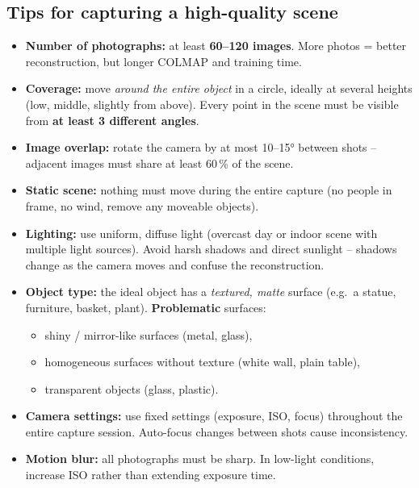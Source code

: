 \documentclass{article}
\begin{document}
\subsection*{Tips for capturing a high-quality scene}

\begin{itemize}
    \item \textbf{Number of photographs:} at least \textbf{60--120 images}.
          More photos = better reconstruction, but longer COLMAP and training time.
    \item \textbf{Coverage:} move \emph{around the entire object} in a circle,
          ideally at several heights (low, middle, slightly from above).
          Every point in the scene must be visible from \textbf{at least 3 different angles}.
    \item \textbf{Image overlap:} rotate the camera by at most 10--15° between shots --
          adjacent images must share at least 60\,\% of the scene.
    \item \textbf{Static scene:} nothing must move during the entire capture
          (no people in frame, no wind, remove any moveable objects).
    \item \textbf{Lighting:} use uniform, diffuse light (overcast day or
          indoor scene with multiple light sources).
          Avoid harsh shadows and direct sunlight -- shadows change as the
          camera moves and confuse the reconstruction.
    \item \textbf{Object type:} the ideal object has a \emph{textured, matte}
          surface (e.g.\ a statue, furniture, basket, plant).
          \textbf{Problematic} surfaces:
          \begin{itemize}
              \item shiny / mirror-like surfaces (metal, glass),
              \item homogeneous surfaces without texture (white wall, plain table),
              \item transparent objects (glass, plastic).
          \end{itemize}
    \item \textbf{Camera settings:} use fixed settings (exposure, ISO, focus)
          throughout the entire capture session.
          Auto-focus changes between shots cause inconsistency.
    \item \textbf{Motion blur:} all photographs must be sharp.
          In low-light conditions, increase ISO rather than extending exposure time.
\end{itemize}
\end{document}
